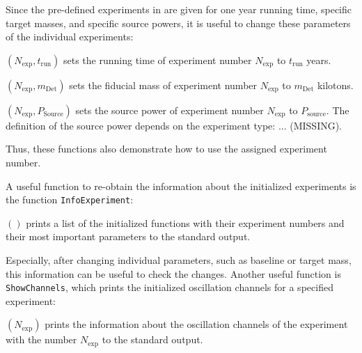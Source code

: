Since the pre-defined experiments in  are given for one year running time, specific target masses, and specific source powers, it is useful to change these parameters of the individual experiments:
\begin{function}
$(N_{\mathrm{exp}},t_{\mathrm{run}})$ sets the running time of experiment number $N_{\mathrm{exp}}$ to $t_{\mathrm{run}}$ years.
\end{function}
 \begin{function}
$(N_{\mathrm{exp}},m_{\mathrm{Det}})$ sets the fiducial mass of experiment number $N_{\mathrm{exp}}$ to $m_{\mathrm{Det}}$ kilotons.
\end{function}
\begin{function}
$(N_{\mathrm{exp}},P_{\mathrm{Source}})$ sets the source power of experiment number $N_{\mathrm{exp}}$ to $P_{\mathrm{source}}$. The definition of the source power depends on the experiment type: ... (MISSING).
\end{function}
Thus, these functions also demonstrate how to use the assigned experiment number.

A useful function to re-obtain the information about the initialized experiments is the function {\tt InfoExperiment}:
\begin{function}
$()$ prints a list of the initialized functions with their experiment numbers and their most important parameters to the standard output.
\end{function} 
Especially, after changing individual parameters, such as baseline or target mass, this information can be useful to check the changes. Another useful function is {\tt ShowChannels}, which prints the initialized oscillation channels for a specified experiment:
\begin{function}
$(N_{\mathrm{exp}})$ prints the information about the oscillation channels of the experiment with the number $N_{\mathrm{exp}}$ to the standard output.
\end{function}


